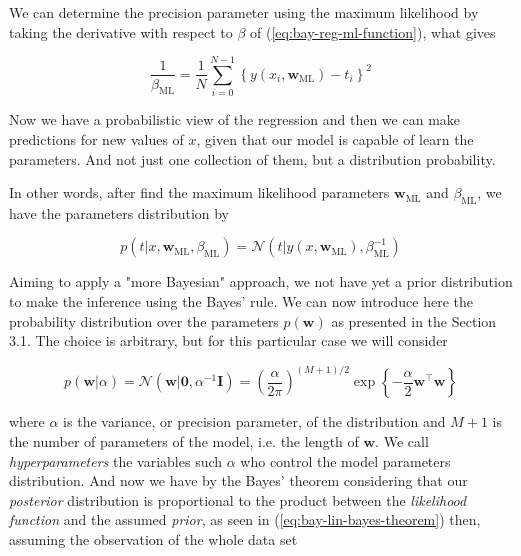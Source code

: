 \documentclass[11pt]{article} %
\begin{document}
We can determine the precision parameter using the maximum likelihood by taking the derivative with respect to $\beta$ of (\ref{eq:bay-reg-ml-function}), what gives

\begin{equation}
   \frac{1}{\beta_{\mathrm{ML}}}=\frac{1}{N} \sum_{i=0}^{N-1}\left\{y\left(x_{i}, \mathbf{w}_{\mathrm{ML}}\right)-t_{i}\right\}^{2}
\end{equation}

Now we have a probabilistic view of the regression and then we can make predictions for new values of $x$, given that our model is capable of learn the parameters. And not just one collection of them, but a distribution probability.

In other words, after find the maximum likelihood parameters $\mathbf{w}_\text{ML}$ and $\beta_\text{ML}$, we have the parameters distribution by

\begin{equation}
   p\left(t | x, \mathbf{w}_{\mathrm{ML}}, \beta_{\mathrm{ML}}\right)=\mathcal{N}\left(t | y\left(x, \mathbf{w}_{\mathrm{ML}}\right), \beta_{\mathrm{ML}}^{-1}\right)
\end{equation}

Aiming to apply a "more Bayesian" approach, we not have yet a prior distribution to make the inference using the Bayes' rule. We can now introduce here the probability distribution over the parameters $p(\mathbf{w})$ as presented in the Section 3.1. The choice is arbitrary, but for this particular case we will consider

\begin{equation}
   \label{eq:bay-lin-reg-prior-dist}
   p(\mathbf{w} | \alpha)=\mathcal{N}\left(\mathbf{w} | \mathbf{0}, \alpha^{-1} \mathbf{I}\right)=\left(\frac{\alpha}{2 \pi}\right)^{(M+1) / 2} \exp \left\{-\frac{\alpha}{2} \mathbf{w}^\top \mathbf{w}\right\}
\end{equation}

where $\alpha$ is the variance, or precision parameter, of the distribution and $M+1$ is the number of parameters of the model, i.e. the length of $\mathbf{w}$. We call \textit{hyperparameters} the variables such $\alpha$ who control the model parameters distribution. And now we have by the Bayes' theorem considering that our \textit{posterior} distribution is proportional to the product between the \textit{likelihood function} and the assumed \textit{prior}, as seen in (\ref{eq:bay-lin-bayes-theorem}) then, assuming the observation of the whole data set
\end{document}

